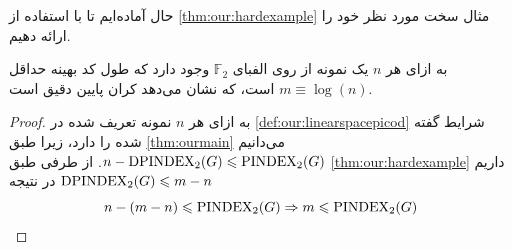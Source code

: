 حال آماده‌ایم تا با استفاده از
\autoref{thm:our:hardexample}
مثال سخت مورد نظر خود را ارائه دهیم.
\begin{corollary}
	به ازای هر 
	$n$
	یک نمونه از 
	\picod
	روی الفبای
	$\mathbb{F}_2$
	وجود دارد که طول کد بهینه حداقل
	$m \equiv \log(n)$
	است، که نشان می‌دهد کران پایین \picod دقیق است.
\end{corollary}
\begin{proof}
	به ازای هر
	$n$
	نمونه تعریف شده در
		\autoref{def:our:linearspacepicod}
	شرایط گفته شده را دارد، زیرا طبق
	\autoref{thm:ourmain}
	می‌دانیم
		$n - \mathrm{DPINDEX}_2(G) \leqslant \mathrm{PINDEX}_2(G)$.
		از طرفی طبق
		\autoref{thm:our:hardexample}
		داریم
		${\mathrm{DPINDEX}_2(G) \leqslant m - n}$
		در نتیجه
		\begin{equation}
			n - (m - n) \leqslant \mathrm{PINDEX}_2(G) \Rightarrow m \leqslant \mathrm{PINDEX}_2(G)
		\end{equation}
\end{proof}
















